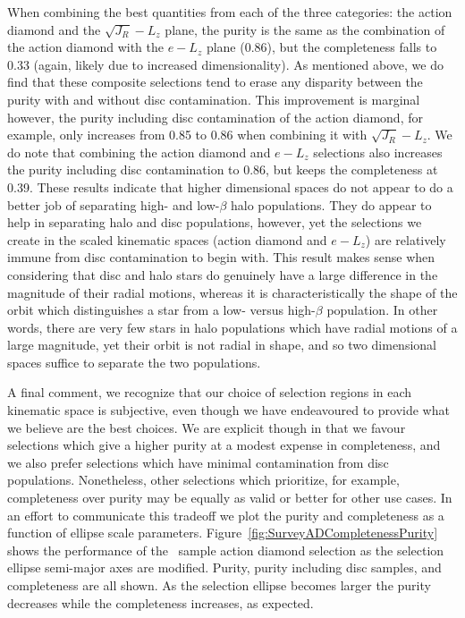 When combining the best quantities from each of the three categories: the action diamond and the $\sqrt{J_{R}}-L_{z}$ plane, the purity is the same as the combination of the action diamond with the $e-L_{z}$ plane (0.86), but the completeness falls to 0.33 (again, likely due to increased dimensionality). As mentioned above, we do find that these composite selections tend to erase any disparity between the purity with and without disc contamination. This improvement is marginal however, the purity including disc contamination of the action diamond, for example, only increases from 0.85 to 0.86 when combining it with $\sqrt{J_{R}}-L_{z}$. We do note that combining the action diamond and $e-L_{z}$ selections also increases the purity including disc contamination to 0.86, but keeps the completeness at 0.39. These results indicate that higher dimensional spaces do not appear to do a better job of separating high- and low-$\beta$ halo populations. They do appear to help in separating halo and disc populations, however, yet the selections we create in the scaled kinematic spaces (action diamond and $e-L_{z}$) are relatively immune from disc contamination to begin with. This result makes sense when considering that disc and halo stars do genuinely have a large difference in the magnitude of their radial motions, whereas it is characteristically the shape of the orbit which distinguishes a star from a low- versus high-$\beta$ population. In other words, there are very few stars in halo populations which have radial motions of a large magnitude, yet their orbit is not radial in shape, and so two dimensional spaces suffice to separate the two populations. 

A final comment, we recognize that our choice of selection regions in each kinematic space is subjective, even though we have endeavoured to provide what we believe are the best choices. We are explicit though in that we favour selections which give a higher purity at a modest expense in completeness, and we also prefer selections which have minimal contamination from disc populations. Nonetheless, other selections which prioritize, for example, completeness over purity may be equally as valid or better for other use cases. In an effort to communicate this tradeoff we plot the purity and completeness as a function of ellipse scale parameters. Figure~\ref{fig:SurveyADCompletenessPurity} shows the performance of the \survey\ sample action diamond selection as the selection ellipse semi-major axes are modified. Purity, purity including disc samples, and completeness are all shown. As the selection ellipse becomes larger the purity decreases while the completeness increases, as expected.

